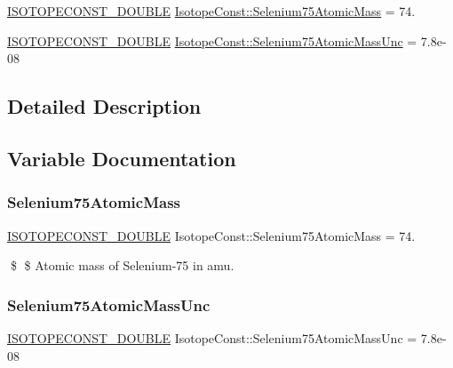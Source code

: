 \begin{DoxyCompactItemize}
\item 
\mbox{\hyperlink{group___isotope_const-_macros_ga8f45a7272ce02c0b4c65c44636ed719a}{I\+S\+O\+T\+O\+P\+E\+C\+O\+N\+S\+T\+\_\+\+D\+O\+U\+B\+LE}} \mbox{\hyperlink{group___isotope_const-_selenium-_se75_ga60d927c179084d9b8989f982a82a5f32}{Isotope\+Const\+::\+Selenium75\+Atomic\+Mass}} = 74.
\item 
\mbox{\hyperlink{group___isotope_const-_macros_ga8f45a7272ce02c0b4c65c44636ed719a}{I\+S\+O\+T\+O\+P\+E\+C\+O\+N\+S\+T\+\_\+\+D\+O\+U\+B\+LE}} \mbox{\hyperlink{group___isotope_const-_selenium-_se75_ga038009e933645699998b27cb210d7a2d}{Isotope\+Const\+::\+Selenium75\+Atomic\+Mass\+Unc}} = 7.\+8e-\/08
\end{DoxyCompactItemize}


\subsection{Detailed Description}


\subsection{Variable Documentation}
\mbox{\label{group___isotope_const-_selenium-_se75_ga60d927c179084d9b8989f982a82a5f32}} 
\subsubsection{\texorpdfstring{Selenium75\+Atomic\+Mass}{Selenium75AtomicMass}}
{\footnotesize\ttfamily \mbox{\hyperlink{group___isotope_const-_macros_ga8f45a7272ce02c0b4c65c44636ed719a}{I\+S\+O\+T\+O\+P\+E\+C\+O\+N\+S\+T\+\_\+\+D\+O\+U\+B\+LE}} Isotope\+Const\+::\+Selenium75\+Atomic\+Mass = 74.}

\$ \$ Atomic mass of Selenium-\/75 in amu. \mbox{\label{group___isotope_const-_selenium-_se75_ga038009e933645699998b27cb210d7a2d}} 
\subsubsection{\texorpdfstring{Selenium75\+Atomic\+Mass\+Unc}{Selenium75AtomicMassUnc}}
{\footnotesize\ttfamily \mbox{\hyperlink{group___isotope_const-_macros_ga8f45a7272ce02c0b4c65c44636ed719a}{I\+S\+O\+T\+O\+P\+E\+C\+O\+N\+S\+T\+\_\+\+D\+O\+U\+B\+LE}} Isotope\+Const\+::\+Selenium75\+Atomic\+Mass\+Unc = 7.\+8e-\/08}

